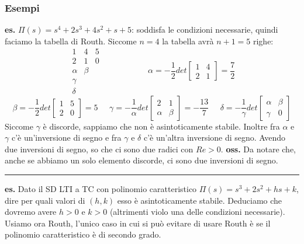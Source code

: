 \subsubsection*{Esempi}
\textbf{es.} $\Pi(s) = s^4 + 2s^3 + 4s^2 + s + 5$: soddisfa le condizioni necessarie, quindi faciamo la tabella di Routh. Siccome $n=4$ la tabella avrà $n+1 = 5$ righe:
\[
    \begin{matrix}
        1 & 4 & 5 \\
        2 & 1 & 0 \\
        \alpha & \beta\\
        \gamma\\
        \delta
    \end{matrix} \;\;\;\;\;\;\;\;\;\;\;\;\;\;\;\;\;\;\;\;\alpha = - \frac{1}{2}det\left[\begin{matrix}
        1&4\\2&1
    \end{matrix}\right] = \frac{7}{2}
\]
\[
     \beta = - \frac{1}{2}det\left[\begin{matrix}
        1&5\\2&0
    \end{matrix}\right]=5 \;\;\;\;\; \gamma= -\frac{1}{\alpha} det \left[\begin{matrix}
        2&1\\\alpha&\beta
    \end{matrix}\right] = - \frac{13}{7} \;\;\;\;\; \delta = - \frac{1}{\gamma} det \left[\begin{matrix}
        \alpha & \beta \\ \gamma &0
    \end{matrix}\right]
\]
Siccome $\gamma$ è discorde, sappiamo che non è asintoticamente stabile.\newline
Inoltre fra $\alpha$ e $\gamma$ c'è un'inversione di segno e fra $\gamma$ e $\delta$ c'è un'altra inversione di segno. Avendo due inversioni di segno, so che ci sono due radici con $Re > 0$.\newline
\newline
\textbf{oss.} Da notare che, anche se abbiamo un solo elemento discorde, ci sono due inversioni di segno.\newline
\rule{\textwidth}{0,4pt}\newline
\newline
\textbf{es.} Dato il SD LTI a TC con polinomio caratteristico $\Pi(s) = s^3 + 2s^2 + hs +k$, dire per quali valori di $(h,k)$ esso è asintoticamente stabile.\newline
Deduciamo che dovremo avere $h>0$ e $k>0$ (altrimenti violo una delle condizioni necessarie). Usiamo ora Routh, l'unico caso in cui si può evitare di usare Routh è se il polinomio caratteristico è di secondo grado.
